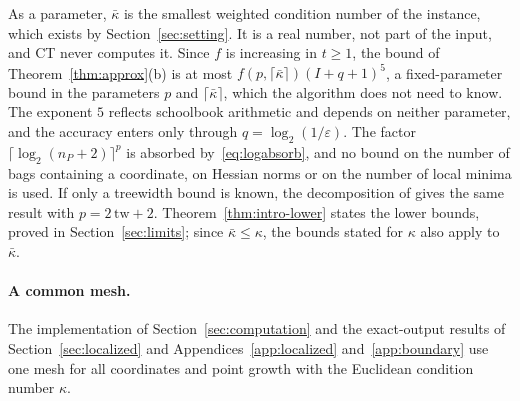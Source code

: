\begin{remark}\label{rem:fpt}
As a parameter, $\bar\kappa$ is the smallest weighted condition number of
the instance, which exists by Section~\ref{sec:setting}. It is a real number,
not part of the input, and CT never computes it. Since $f$ is
increasing in $t\ge1$, the bound of Theorem~\ref{thm:approx}(b) is at most
$f(p,\lceil\bar\kappa\rceil)(I+q+1)^5$, a fixed-parameter bound in the
parameters $p$ and $\lceil\bar\kappa\rceil$, which the algorithm does not
need to know. The exponent $5$ reflects schoolbook arithmetic and depends on
neither parameter, and the accuracy enters only through
$q=\log_2(1/\varepsilon)$. The factor $\lceil\log_2(n_P+2)\rceil^p$ is
absorbed by~\eqref{eq:logabsorb}, and no bound on the number of bags
containing a coordinate, on Hessian norms or on the number of local minima is
used. If only a treewidth bound is known, the decomposition of
\cite{Korhonen2021} gives the same result with $p=2\,\mathrm{tw}+2$.
Theorem~\ref{thm:intro-lower} states the lower bounds, proved in
Section~\ref{sec:limits}; since $\bar\kappa\le\kappa$, the bounds stated
for $\kappa$ also apply to $\bar\kappa$.
\end{remark}

\paragraph{A common mesh.}
The implementation of Section~\ref{sec:computation} and the exact-output
results of Section~\ref{sec:localized} and
Appendices~\ref{app:localized} and~\ref{app:boundary} use one mesh for all
coordinates and point growth with the Euclidean condition number $\kappa$.

